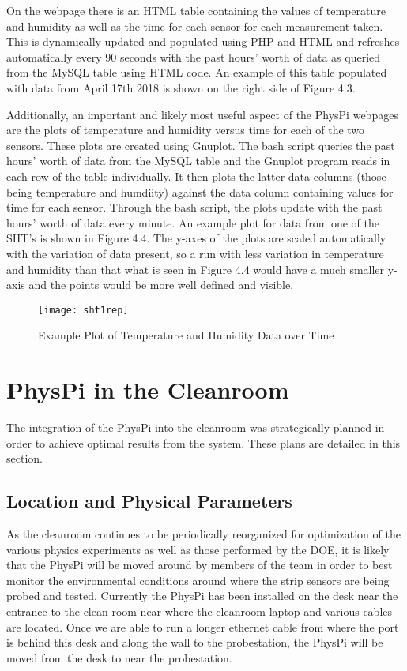 \documentclass[letterpaper, 11pt]{report}
\begin{document}
On the webpage there is an HTML table containing the values of temperature and humidity as well as the time for each sensor for each measurement taken.  This is dynamically updated and populated using PHP and HTML and refreshes automatically every 90 seconds with the past hours' worth of data as queried from the MySQL table using HTML code.  An example of this table populated with data from April 17th 2018 is shown on the right side of Figure 4.3.

Additionally, an important and likely most useful aspect of the PhysPi webpages are the plots of temperature and humidity versus time for each of the two sensors.  These plots are created using Gnuplot.  The bash script queries the past hours' worth of data from the MySQL table and the Gnuplot program reads in each row of the table individually.  It then plots the latter data columns (those being temperature and humdiity) against the data column containing values for time for each sensor.  Through the bash script, the plots update with the past hours' worth of data every minute.  An example plot for data from one of the SHT's is shown in Figure 4.4.  The y-axes of the plots are scaled automatically with the variation of data present, so a run with less variation in temperature and humidity than that what is seen in Figure 4.4 would have a much smaller y-axis and the points would be more well defined and visible.

\begin{figure}[h]
\centering
\texttt{[image: sht1rep]}
\caption{Example Plot of Temperature and Humidity Data over Time}
\end{figure}

\section{PhysPi in the Cleanroom}

The integration of the PhysPi into the cleanroom was strategically planned in order to achieve optimal results from the system.  These plans are detailed in this section.

\subsection{Location and Physical Parameters}

As the cleanroom continues to be periodically reorganized for optimization of the various physics experiments as well as those performed by the DOE, it is likely that the PhysPi will be moved around by members of the team in order to best monitor the environmental conditions around where the strip sensors are being probed and tested.  Currently the PhysPi has been installed on the desk near the entrance to the clean room near where the cleanroom laptop and various cables are located.  Once we are able to run a longer ethernet cable from where the port is behind this desk and along the wall to the probestation, the PhysPi will be moved from the desk to near the probestation.
\end{document}
